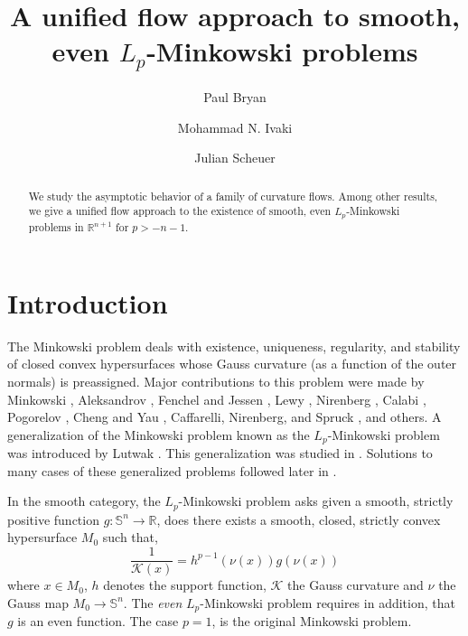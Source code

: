 \documentclass{amsart}
\theoremstyle{definition}
\theoremstyle{remark}
\numberwithin{equation}{section}
\begin{document}
\title[]
 {A unified flow approach to smooth, even $L_p$-Minkowski problems}

\author[P. Bryan]{Paul Bryan}
\address{Mathematics Institute, University of Warwick
Coventry, CV4 7AL, England}
\author[M.N. Ivaki]{Mohammad N. Ivaki}
\address{Institut f\"{u}r Diskrete Mathematik und Geometrie, Technische Universit\"{a}t Wien,
Wiedner Hauptstr. 8--10, 1040 Wien, Austria}
\author[J. Scheuer]{Julian Scheuer}
\address{Albert-Ludwigs-Universit\"{a}t,
Mathematisches Institut, Eckerstr. 1, 79104
Freiburg, Germany}
\dedicatory{}
\subjclass[2010]{}
\keywords{}

\begin{abstract}
We study the asymptotic behavior of a family of curvature flows. Among other results, we give a unified flow approach to the existence of smooth, even $L_p$-Minkowski problems in $\mathbb{R}^{n+1}$ for $p>-n-1.$
\end{abstract}

\maketitle
\section{Introduction}
The Minkowski problem deals with existence, uniqueness, regularity, and stability of closed convex hypersurfaces whose Gauss curvature (as a function of the outer normals) is preassigned. Major contributions to this problem were made by Minkowski \cite{M1,M2}, Aleksandrov \cite{A2,A3,A4}, Fenchel and Jessen \cite{FJ}, Lewy \cite{Le1,Le2}, Nirenberg \cite{N}, Calabi \cite{Cal}, Pogorelov \cite{P1,P2}, Cheng and Yau \cite{ChYau}, Caffarelli, Nirenberg, and Spruck \cite{CNS}, and others. A generalization of the Minkowski problem known as the $L_p$-Minkowski problem was introduced by Lutwak \cite{Lu1,Lu2}. This generalization was studied in \cite{Lu1,LuO}. Solutions to many cases of these generalized problems followed later in \cite{1,AnCrys,Andrews Ben 2000,Andrews 2003,27,36,39,49,50,51,72,LYZ,79,104,110,s1,s2,Zhu1,Zhu2,Zhu3,jiang,QL,DZ}.

In the smooth category, the $L_p$-Minkowski problem asks given a smooth, strictly positive function $g : \mathbb{S}^n \to \mathbb{R}$, does there exists a smooth, closed, strictly convex hypersurface $M_0$ such that,
\begin{equation}
\label{e:lp}
\frac{1}{\mathcal{K}(x)} = h^{p-1}(\nu(x)) g(\nu(x))
\end{equation}
where $x \in M_0$, $h$ denotes the support function, $\mathcal{K}$ the Gauss curvature and $\nu$ the Gauss map $M_0 \to \mathbb{S}^n$. The \emph{even} $L_p$-Minkowski problem requires in addition, that $g$ is an even function. The case $p=1$, is the original Minkowski problem.
\end{document}
